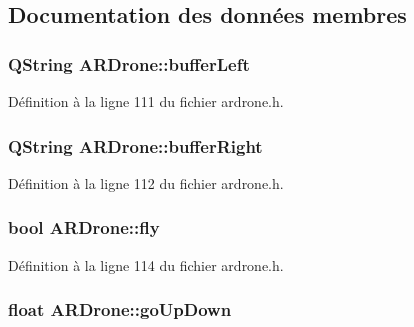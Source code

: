 \subsection{Documentation des données membres}
\hypertarget{class_a_r_drone_aae2300ce3535a758fd413b27d998a3e2}{
\subsubsection[{buffer\-Left}]{\setlength{\rightskip}{0pt plus 5cm}Q\-String A\-R\-Drone\-::buffer\-Left\hspace{0.3cm}{\ttfamily [private]}}}\label{class_a_r_drone_aae2300ce3535a758fd413b27d998a3e2}


Définition à la ligne 111 du fichier ardrone.\-h.

\hypertarget{class_a_r_drone_aa865842de35bdb04ffa21805d4c4c9c4}{
\subsubsection[{buffer\-Right}]{\setlength{\rightskip}{0pt plus 5cm}Q\-String A\-R\-Drone\-::buffer\-Right\hspace{0.3cm}{\ttfamily [private]}}}\label{class_a_r_drone_aa865842de35bdb04ffa21805d4c4c9c4}


Définition à la ligne 112 du fichier ardrone.\-h.

\hypertarget{class_a_r_drone_abf1aad9db871e16087c3529814287b96}{
\subsubsection[{fly}]{\setlength{\rightskip}{0pt plus 5cm}bool A\-R\-Drone\-::fly\hspace{0.3cm}{\ttfamily [private]}}}\label{class_a_r_drone_abf1aad9db871e16087c3529814287b96}


Définition à la ligne 114 du fichier ardrone.\-h.

\hypertarget{class_a_r_drone_a10e045b2d41b960d6029f8ac1509eb90}{
\subsubsection[{go\-Up\-Down}]{\setlength{\rightskip}{0pt plus 5cm}float A\-R\-Drone\-::go\-Up\-Down\hspace{0.3cm}{\ttfamily [private]}}}\label{class_a_r_drone_a10e045b2d41b960d6029f8ac1509eb90}


